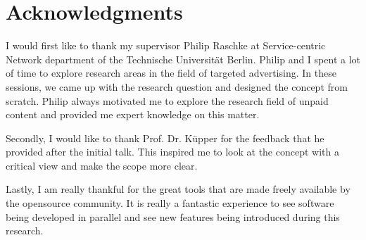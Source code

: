 \chapter*{Acknowledgments}
\label{cha:acknowledgments}

I would first like to thank my supervisor Philip Raschke at Service-centric Network department of the Technische Universität Berlin. Philip and I spent a lot of time to explore research areas in the field of targeted advertising. In these sessions, we came up with the research question and designed the concept from scratch. Philip always motivated me to explore the research field of unpaid content and provided me expert knowledge on this matter. 

Secondly, I would like to thank Prof. Dr. Küpper for the feedback that he provided after the initial talk. This inspired me to look at the concept with a critical view and make the scope more clear.

Lastly, I am really thankful for the great tools that are made freely available by the opensource community. It is really a fantastic experience to see software being developed in parallel and see new features being introduced during this research. 